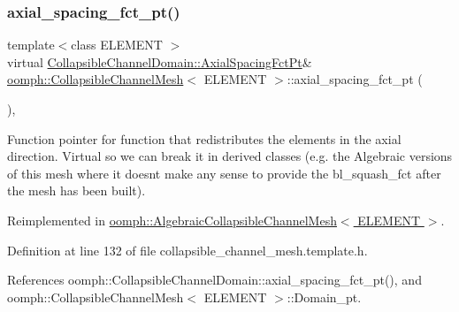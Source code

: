 \subsubsection{\texorpdfstring{axial\+\_\+spacing\+\_\+fct\+\_\+pt()}{axial\_spacing\_fct\_pt()}\hspace{0.1cm}{\footnotesize\ttfamily [1/2]}}
{\footnotesize\ttfamily template$<$class E\+L\+E\+M\+E\+NT $>$ \\
virtual \hyperlink{classoomph_1_1CollapsibleChannelDomain_a317472dab112beac771ecf6442a465f5}{Collapsible\+Channel\+Domain\+::\+Axial\+Spacing\+Fct\+Pt}\& \hyperlink{classoomph_1_1CollapsibleChannelMesh}{oomph\+::\+Collapsible\+Channel\+Mesh}$<$ E\+L\+E\+M\+E\+NT $>$\+::axial\+\_\+spacing\+\_\+fct\+\_\+pt (\begin{DoxyParamCaption}{ }\end{DoxyParamCaption})\hspace{0.3cm}{\ttfamily [inline]}, {\ttfamily [virtual]}}



Function pointer for function that redistributes the elements in the axial direction. Virtual so we can break it in derived classes (e.\+g. the Algebraic versions of this mesh where it doesn\textquotesingle{}t make any sense to provide the bl\+\_\+squash\+\_\+fct after the mesh has been built). 



Reimplemented in \hyperlink{classoomph_1_1AlgebraicCollapsibleChannelMesh_afa53bd526ff0903526afbdf5e6f4f532}{oomph\+::\+Algebraic\+Collapsible\+Channel\+Mesh$<$ E\+L\+E\+M\+E\+N\+T $>$}.



Definition at line 132 of file collapsible\+\_\+channel\+\_\+mesh.\+template.\+h.



References oomph\+::\+Collapsible\+Channel\+Domain\+::axial\+\_\+spacing\+\_\+fct\+\_\+pt(), and oomph\+::\+Collapsible\+Channel\+Mesh$<$ E\+L\+E\+M\+E\+N\+T $>$\+::\+Domain\+\_\+pt.

\mbox{\label{classoomph_1_1CollapsibleChannelMesh_a7a615ef1fcb4cb422e3c78267818ceec}} 
